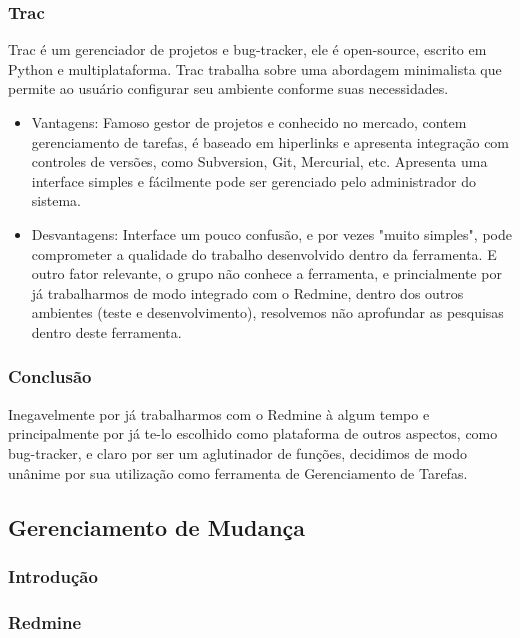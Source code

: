 \documentclass[12pt,a4paper]{article}
\begin{document}
		\subsubsection{Trac}
		
			Trac é um gerenciador de projetos e bug-tracker, ele é open-source, escrito em Python e multiplataforma. Trac trabalha sobre uma abordagem minimalista que permite ao usuário configurar seu ambiente conforme suas necessidades. 
		
		\begin{itemize}
			\item Vantagens: 
				Famoso gestor de projetos e conhecido no mercado, contem gerenciamento de tarefas, é baseado em hiperlinks e apresenta integração com controles de versões, como Subversion, Git, Mercurial, etc. Apresenta uma interface simples e fácilmente pode ser gerenciado pelo administrador do sistema. 
			\item Desvantagens: 
				Interface um pouco confusão, e por vezes "muito simples", pode comprometer a qualidade do trabalho desenvolvido dentro da ferramenta.
				E outro fator relevante, o grupo não conhece a ferramenta, e princialmente por já trabalharmos de modo integrado com o Redmine, dentro dos outros ambientes (teste e desenvolvimento), resolvemos não aprofundar as pesquisas dentro deste ferramenta.
		\end{itemize}
		
		
		\subsubsection{Conclusão}
			Inegavelmente por já trabalharmos com o Redmine à algum tempo e principalmente por já te-lo escolhido como plataforma de outros aspectos, como bug-tracker, e claro por ser um aglutinador de funções, decidimos de modo unânime por sua utilização como ferramenta de Gerenciamento de Tarefas. 
		
		
	\clearpage	
	\subsection{Gerenciamento de Mudança}
	
		\subsubsection{Introdução}
		
			
		
		\subsubsection{Redmine}
		
\end{document}
